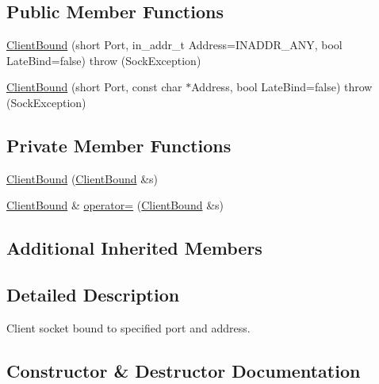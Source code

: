 \subsection*{Public Member Functions}
\begin{DoxyCompactItemize}
\item 
\hyperlink{classClientBound_adc8c442faa9ed2b05ea24cfe1bcb7679}{Client\+Bound} (short Port, in\+\_\+addr\+\_\+t Address=I\+N\+A\+D\+D\+R\+\_\+\+A\+NY, bool Late\+Bind=false)  throw (\+Sock\+Exception)
\item 
\hyperlink{classClientBound_a2ca4ff662cd665bf2bd6b43e5f8cc900}{Client\+Bound} (short Port, const char $\ast$Address, bool Late\+Bind=false)  throw (\+Sock\+Exception)
\end{DoxyCompactItemize}
\subsection*{Private Member Functions}
\begin{DoxyCompactItemize}
\item 
\hyperlink{classClientBound_a522f849f74cff7047dee970636d2ceb8}{Client\+Bound} (\hyperlink{classClientBound}{Client\+Bound} \&s)
\item 
\hyperlink{classClientBound}{Client\+Bound} \& \hyperlink{classClientBound_ad45c42b6d277891f1672fd8b6de9af7b}{operator=} (\hyperlink{classClientBound}{Client\+Bound} \&s)
\end{DoxyCompactItemize}
\subsection*{Additional Inherited Members}


\subsection{Detailed Description}
Client socket bound to specified port and address. 

\subsection{Constructor \& Destructor Documentation}
\mbox{\label{classClientBound_adc8c442faa9ed2b05ea24cfe1bcb7679}} 
